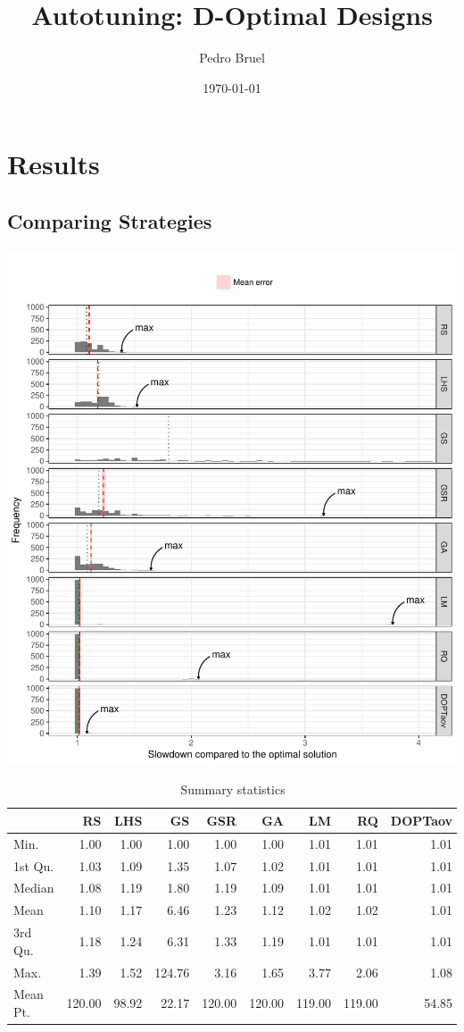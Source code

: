 \documentclass[final,12pt,a4paper]{article}
\author{Pedro Bruel}
\date{\today}
\title{Autotuning: D-Optimal Designs}
\begin{document}
\maketitle
\tableofcontents


\section{Results}
\label{sec:org4e30812}
\subsection{Comparing Strategies}
\label{sec:org9c613e5}
\begin{center}
\includegraphics[width=.9\linewidth]{../img/comparison_histogram.pdf}
\end{center}

\begin{table}[ht]
\centering
\begin{tabular}{lrrrrrrrr}
  \hline
 & RS & LHS & GS & GSR & GA & LM & RQ & DOPTaov \\ 
  \hline
Min. & 1.00 & 1.00 & 1.00 & 1.00 & 1.00 & 1.01 & 1.01 & 1.01 \\ 
  1st Qu. & 1.03 & 1.09 & 1.35 & 1.07 & 1.02 & 1.01 & 1.01 & 1.01 \\ 
  Median & 1.08 & 1.19 & 1.80 & 1.19 & 1.09 & 1.01 & 1.01 & 1.01 \\ 
  Mean & 1.10 & 1.17 & 6.46 & 1.23 & 1.12 & 1.02 & 1.02 & 1.01 \\ 
  3rd Qu. & 1.18 & 1.24 & 6.31 & 1.33 & 1.19 & 1.01 & 1.01 & 1.01 \\ 
  Max. & 1.39 & 1.52 & 124.76 & 3.16 & 1.65 & 3.77 & 2.06 & 1.08 \\ 
  Mean Pt. & 120.00 & 98.92 & 22.17 & 120.00 & 120.00 & 119.00 & 119.00 & 54.85 \\ 
   \hline
\end{tabular}
\caption{Summary statistics} 
\end{table}
\end{document}
